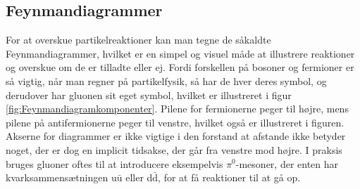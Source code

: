 \subsection{Feynmandiagrammer} \label{sec:feynman}
For at overskue partikelreaktioner kan man tegne de såkaldte Feynmandiagrammer, hvilket er en simpel og visuel måde at illustrere reaktioner og overskue om de er tilladte eller ej. Fordi forskellen på bosoner og fermioner er så vigtig, når man regner på partikelfysik, så har de hver deres symbol, og derudover har gluonen sit eget symbol, hvilket er illustreret i figur \ref{fig:Feynmandiagramkomponenter}. Pilene for fermionerne peger til højre, mens pilene på antifermionerne peger til venstre, hvilket også er illustreret i figuren. Akserne for diagrammer er ikke vigtige i den forstand at afstande ikke betyder noget, der er dog en implicit tidsakse, der går fra venstre mod højre. I praksis bruges gluoner oftes til at introducere eksempelvis $\pi^0$-mesoner, der enten har kvarksammensætningen u$\bar{\mathrm u}$ eller d$\bar{\mathrm d}$, for at få reaktioner til at gå op.
%
